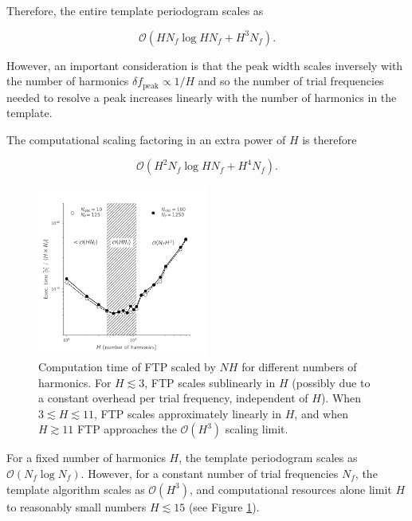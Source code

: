 \documentclass[apj]{emulateapj}
\newcommand{\bigO}{\mathcal{O}}
\begin{document}
Therefore, the entire template periodogram scales as

\begin{equation}
\bigO(HN_f \log HN_f + H^3N_f).
\end{equation}

However, an important consideration is that the peak width scales inversely with the number of harmonics $\delta f_{\mathrm{peak}} \propto 1/H$ and so the number of trial frequencies needed to resolve a peak increases linearly with the number of harmonics in the template.

The computational scaling factoring in an extra power of $H$ is therefore

\begin{equation}
\bigO(H^2N_f \log HN_f + H^4N_f).
\end{equation}


\begin{figure}
    \centering
    \includegraphics[width=0.5\textwidth]{timing_vs_nharm.pdf}
    \caption{\label{fig:timingnharm} Computation time of FTP scaled by $NH$ for
            different numbers of harmonics. For $H\lesssim 3$, FTP scales
            sublinearly in $H$ (possibly due to a constant overhead per
            trial frequency, independent of $H$). When $3 \lesssim H \lesssim 11$,
            FTP scales approximately linearly in $H$, and when $H \gtrsim 11$
            FTP approaches the $\bigO(H^3)$ scaling limit.}
\end{figure}

For a fixed number of harmonics $H$, the template periodogram scales as
$\bigO(N_f\log N_f)$. However, for a constant number of trial frequencies $N_f$,
the template algorithm scales as $\bigO(H^3)$, and computational resources
alone limit $H$ to reasonably small numbers $H\lesssim15$ (see Figure \ref{fig:timingnharm}).


\end{document}
